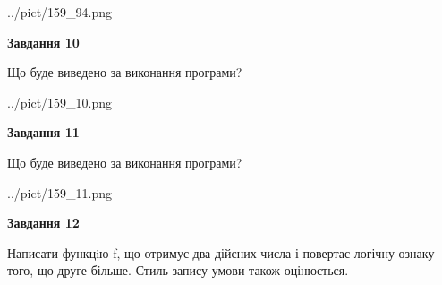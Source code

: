 \documentclass[12pt, ukrainian]{article}
\begin{document}
{\begin {large}
\begin{center}
	{../pict/159_94.png}
\end{center}
\newpage

{\begin {center}\textbf{Завдання 10}\end {center}}

Що буде виведено за виконання програми?\par
\begin{center}
	{../pict/159_10.png}
\end{center}
\newpage

{\begin {center}\textbf{Завдання 11}\end {center}}

Що буде виведено за виконання програми?\par
\begin{center}
	{../pict/159_11.png}
\end{center}
\newpage

{\begin {center}\textbf{Завдання 12}\end {center}}


Написати функцiю f, що отримує два дійсних числа і повертає логічну ознаку того, що друге більше. Стиль запису умови також оцінюється.\par
\newpage

\end {large}}
\end{document}

